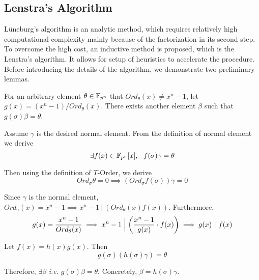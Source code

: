 \subsection{Lenstra's Algorithm}
L\"uneburg's algorithm is an analytic method, which requires relatively high computational complexity 
mainly because of the factorization in its second step. To overcome the high cost, an inductive method 
is proposed, which is the Lenstra's algorithm. It allows for setup of heuristics to accelerate the procedure.
Before introducing the details of the algorithm, we demonstrate two preliminary lemmas.
\begin{Lemma}
\label{lem:4}
For an arbitrary element $\theta \in {\mathbb{F}}_{p^n}$ that $Ord_\theta(x) \neq x^n - 1$,
let $g(x) = (x^n - 1)/Ord_\theta(x)$. There exists another element $\beta$ such that $g(\sigma)\beta = \theta$.
\end{Lemma}
\begin{Proof}
Assume $\gamma$ is the desired normal element. From the definition of normal element we derive 
$$\exists f(x)\in {\mathbb{F}}_{p^n}[x],~~f(\sigma)\gamma = \theta$$

Then using the definition of $T$-Order, we derive
$$Ord_{\sigma}\theta = 0 \implies (Ord_{\sigma}f(\sigma))\gamma = 0$$

Since $\gamma$ is the normal element, $Ord_\gamma(x) = x^n-1\implies x^n-1~|~(Ord_\theta(x)f(x))$.
Furthermore,
$$g(x) = \frac{x^n-1}{Ord_\theta(x)} \implies x^n-1\Bigm|\left(\frac{x^n-1}{g(x)}\cdot f(x)\right)\implies g(x)~|~f(x)$$

Let $f(x)=h(x)g(x)$. Then
$$g(\sigma)(h(\sigma)\gamma) = \theta$$

Therefore, $\exists \beta$ {\it i.e. }$g(\sigma)\beta = \theta$. Concretely, $\beta = h(\sigma)\gamma$.
\end{Proof}

